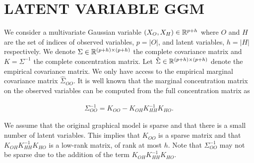 \documentclass[letterpaper]{article}
\begin{document}
%
%
%

\section{LATENT VARIABLE GGM}

\label{sec:ggm}
We consider a multivariate Gaussian variable $(X_{O},X_{H})\in\mathbb{R}^{p+h}$ where $O$ and $H$ are the set of indices of observed variables, $p=|O|$, and latent variables, $h=|H|$ respectively. We denote $\Sigma\in\mathbb{R}^{(p+h)\times(p+h)}$ the complete covariance matrix and $K=\Sigma^{-1}$ the complete concentration matrix. Let $\hat{\Sigma}\in\mathbb{R}^{(p+h)\times(p+h)}$ denote the empirical covariance matrix. We only have access to the empirical marginal covariance matrix $\hat{\Sigma}_{OO}$. It is well known that the marginal concentration matrix on the observed variables can be computed from the full concentration matrix as

\begin{align}
\label{schur}
\Sigma_{OO}^{-1} = K_{OO}-K_{OH}K_{HH}^{-1}K_{HO}.
\end{align}

We assume that the original graphical model is sparse and that there is a small number of latent variables. 
This implies that  $K_{OO}$ is a sparse matrix and that $K_{OH}K_{HH}^{-1}K_{HO}$ is a low-rank matrix, of rank at most $h$. Note that $\Sigma_{OO}^{-1}$ may not be sparse due to the addition of the term $K_{OH}K_{HH}^{-1}K_{HO}$. 

\newcommand{\hnode}{-2}
\newcommand{\wlo}{1.5}
\end{document}
